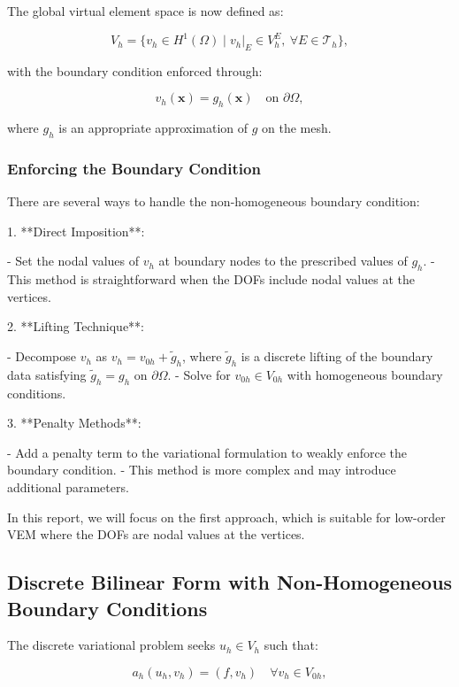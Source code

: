 \documentclass[class=article, crop=false]{standalone}
\begin{document}
The global virtual element space is now defined as:

\[
V_h = \{ v_h \in H^1(\Omega) \mid v_h|_E \in V_h^E, \ \forall E \in \mathcal{T}_h \},
\]

with the boundary condition enforced through:

\[
v_h(\mathbf{x}) = g_h(\mathbf{x}) \quad \text{on } \partial \Omega,
\]

where $g_h$ is an appropriate approximation of $g$ on the mesh.

\subsubsection{Enforcing the Boundary Condition}

There are several ways to handle the non-homogeneous boundary condition:

1. **Direct Imposition**:

   - Set the nodal values of $v_h$ at boundary nodes to the prescribed values of $g_h$.
   - This method is straightforward when the DOFs include nodal values at the vertices.

2. **Lifting Technique**:

   - Decompose $v_h$ as $v_h = v_{0h} + \tilde{g}_h$, where $\tilde{g}_h$ is a discrete lifting of the boundary data satisfying $\tilde{g}_h = g_h$ on $\partial \Omega$.
   - Solve for $v_{0h} \in V_{0h}$ with homogeneous boundary conditions.

3. **Penalty Methods**:

   - Add a penalty term to the variational formulation to weakly enforce the boundary condition.
   - This method is more complex and may introduce additional parameters.

In this report, we will focus on the first approach, which is suitable for low-order VEM where the DOFs are nodal values at the vertices.

\subsection{Discrete Bilinear Form with Non-Homogeneous Boundary Conditions}

The discrete variational problem seeks $u_h \in V_h$ such that:

\begin{equation}
a_h(u_h, v_h) = (f, v_h) \quad \forall v_h \in V_{0h}, \label{eq:discrete_variational}
\end{equation}
\end{document}
